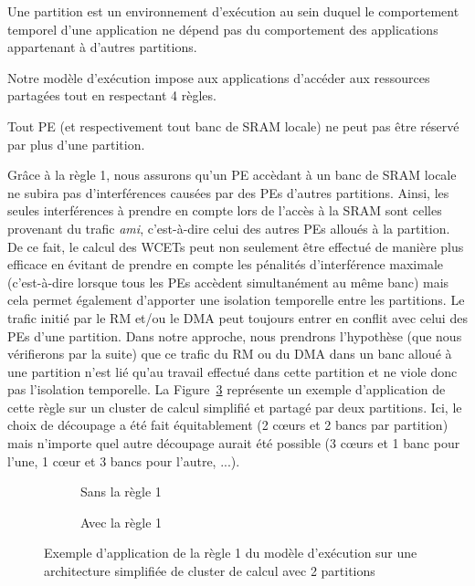 \documentclass[main.tex]{subfiles}
\begin{document}
\begin{defFr}[Partition]
    Une partition est un environnement d'exécution au sein duquel le comportement temporel d'une application ne dépend pas du comportement des applications appartenant à d'autres partitions.
\end{defFr}

Notre modèle d'exécution impose aux applications d'accéder aux ressources partagées tout en respectant 4 règles.

\begin{regleem}
    \label{em_resumeFr_regle1}
    Tout PE (et respectivement tout banc de SRAM locale) ne peut pas être réservé par plus d'une partition.
\end{regleem}

Grâce à la règle 1, nous assurons qu'un PE accèdant à un banc de SRAM locale ne subira pas d'interférences causées par des PEs d'autres partitions. Ainsi, les seules interférences à prendre en compte lors de l'accès à la SRAM sont celles provenant du trafic \emph{ami}, c'est-à-dire celui des autres PEs alloués à la partition. De ce fait, le calcul des WCETs peut non seulement être effectué de manière plus efficace en évitant de prendre en compte les pénalités d'interférence maximale (c'est-à-dire lorsque tous les PEs accèdent simultanément au même banc) mais cela permet également d'apporter une isolation temporelle entre les partitions. Le trafic initié par le RM et/ou le DMA peut toujours entrer en conflit avec celui des PEs d'une partition. Dans notre approche, nous prendrons l'hypothèse (que nous vérifierons par la suite) que ce trafic du RM ou du DMA dans un banc alloué à une partition n'est lié qu'au travail effectué dans cette partition et ne viole donc pas l'isolation temporelle. La Figure~\ref{fig_resumeFr_exampleRule1} représente un exemple d'application de cette règle sur un cluster de calcul simplifié et partagé par deux partitions. Ici, le choix de découpage a été fait équitablement (2 c\oe{}urs et 2 bancs par partition) mais n'importe quel autre découpage aurait été possible (3 c\oe{}urs et 1 banc pour l'une, 1 c\oe{}ur et 3 bancs pour l'autre, ...).
\begin{figure}
    \centering
    \begin{subfigure}[b]{0.45\linewidth}
    \centering
        \scalebox{0.7}{}
        \caption{Sans la règle 1}
        \label{fig_resumeFr_exampleRule1_before}
    \end{subfigure}
    \begin{subfigure}[b]{0.45\linewidth}
    \centering
        \scalebox{0.7}{}
        \caption{Avec la règle 1}
        \label{fig_resumeFrl_exampleRule1_after}
    \end{subfigure}
    \caption{Exemple d'application de la règle 1 du modèle d'exécution sur une architecture simplifiée de cluster de calcul avec 2 partitions}
    \label{fig_resumeFr_exampleRule1}
\end{figure}
\end{document}
